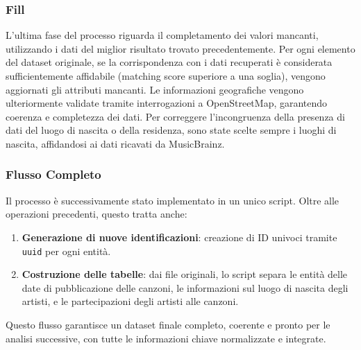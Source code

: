 \subsubsection*{Fill}
L'ultima fase del processo riguarda il completamento dei valori mancanti,
utilizzando i dati del miglior risultato trovato precedentemente.  
Per ogni elemento del dataset originale, se la corrispondenza con i dati
recuperati è considerata sufficientemente affidabile
(matching score superiore a una soglia), vengono aggiornati gli
attributi mancanti.
Le informazioni geografiche vengono ulteriormente validate
tramite interrogazioni a OpenStreetMap, garantendo coerenza e
completezza dei dati. Per correggere l'incongruenza della presenza di
dati del luogo di nascita o della residenza, sono state scelte sempre
i luoghi di nascita, affidandosi ai dati ricavati da MusicBrainz.

\subsubsection*{Flusso Completo}

Il processo è successivamente stato implementato in un unico script.
Oltre alle operazioni precedenti, questo tratta anche:

\begin{enumerate}
    \item \textbf{Generazione di nuove identificazioni}: creazione di
    ID univoci tramite \texttt{uuid} per ogni entità.
    
    \item \textbf{Costruzione delle tabelle}: dai file originali,
    lo script separa le entità delle date di pubblicazione
    delle canzoni, le informazioni sul luogo di nascita degli
    artisti, e le partecipazioni degli artisti alle canzoni. 
\end{enumerate}

Questo flusso garantisce un dataset finale completo, coerente e pronto
per le analisi successive, con tutte le informazioni chiave normalizzate
e integrate.
